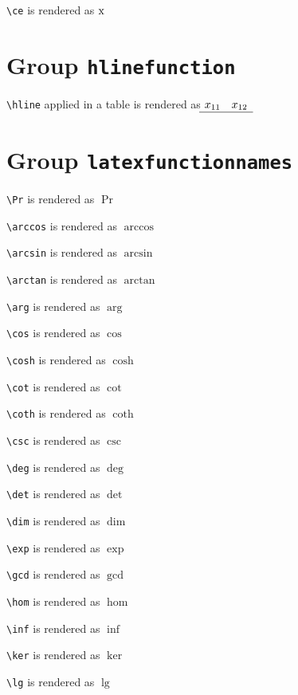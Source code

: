 \texttt{\textbackslash ce} is rendered as $\ce{x}$

\section{ Group \texttt{hline\textunderscore function}}

\texttt{\textbackslash hline} applied in a table is rendered as $\begin{matrix} x_{11} & x_{12} \\ \hline \end{matrix}$

\section{ Group \texttt{latex\textunderscore function\textunderscore names}}

\texttt{\textbackslash Pr} is rendered as $\Pr$

\texttt{\textbackslash arccos} is rendered as $\arccos$

\texttt{\textbackslash arcsin} is rendered as $\arcsin$

\texttt{\textbackslash arctan} is rendered as $\arctan$

\texttt{\textbackslash arg} is rendered as $\arg$

\texttt{\textbackslash cos} is rendered as $\cos$

\texttt{\textbackslash cosh} is rendered as $\cosh$

\texttt{\textbackslash cot} is rendered as $\cot$

\texttt{\textbackslash coth} is rendered as $\coth$

\texttt{\textbackslash csc} is rendered as $\csc$

\texttt{\textbackslash deg} is rendered as $\deg$

\texttt{\textbackslash det} is rendered as $\det$

\texttt{\textbackslash dim} is rendered as $\dim$

\texttt{\textbackslash exp} is rendered as $\exp$

\texttt{\textbackslash gcd} is rendered as $\gcd$

\texttt{\textbackslash hom} is rendered as $\hom$

\texttt{\textbackslash inf} is rendered as $\inf$

\texttt{\textbackslash ker} is rendered as $\ker$

\texttt{\textbackslash lg} is rendered as $\lg$

